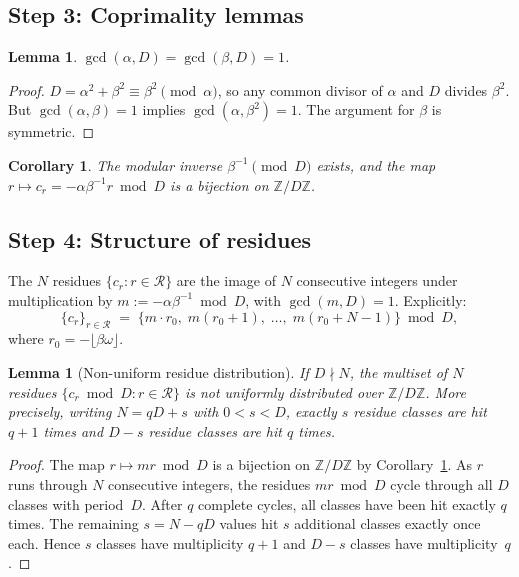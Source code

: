 \documentclass[11pt]{article}
\theoremstyle{plain}
\newtheorem{lemma}[theorem]{Lemma}
\newtheorem{corollary}[theorem]{Corollary}
\theoremstyle{definition}
\theoremstyle{remark}
\begin{document}
\subsection{Step 3: Coprimality lemmas}\label{subsec:step3}

\begin{lemma}\label{lem:gcd}
\(\gcd(\alpha, D) = \gcd(\beta, D) = 1\).
\end{lemma}

\begin{proof}
\(D = \alpha^2 + \beta^2 \equiv \beta^2 \pmod{\alpha}\), so any common
divisor of \(\alpha\) and \(D\) divides \(\beta^2\).  But
\(\gcd(\alpha,\beta)=1\) implies \(\gcd(\alpha,\beta^2)=1\).
The argument for \(\beta\) is symmetric.
\end{proof}

\begin{corollary}\label{cor:inverse}
The modular inverse \(\beta^{-1} \pmod{D}\) exists, and the map
\(r \mapsto c_r = -\alpha\beta^{-1}r \bmod D\) is a bijection on
\(\mathbb{Z}/D\mathbb{Z}\).
\end{corollary}

\subsection{Step 4: Structure of residues}\label{subsec:step4}

The \(N\) residues \(\{c_r : r \in \mathcal{R}\}\) are the image of \(N\)
consecutive integers under multiplication by
\(m := -\alpha\beta^{-1} \bmod D\), with \(\gcd(m, D) = 1\).  Explicitly:
\begin{equation}\label{eq:residues}
    \{c_r\}_{r \in \mathcal{R}} \;=\;
    \{m \cdot r_0,\; m(r_0+1),\; \ldots,\; m(r_0+N-1)\} \bmod D,
\end{equation}
where \(r_0 = -\lfloor\beta\omega\rfloor\).

\begin{lemma}[Non-uniform residue distribution]\label{lem:nonuniform}
If \(D \nmid N\), the multiset of \(N\) residues
\(\{c_r \bmod D : r \in \mathcal{R}\}\) is not uniformly distributed over
\(\mathbb{Z}/D\mathbb{Z}\).  More precisely, writing \(N = qD + s\) with
\(0 < s < D\), exactly \(s\) residue classes are hit \(q+1\) times and
\(D - s\) residue classes are hit \(q\) times.
\end{lemma}

\begin{proof}
The map \(r \mapsto mr \bmod D\) is a bijection on
\(\mathbb{Z}/D\mathbb{Z}\) by Corollary~\ref{cor:inverse}.
As \(r\) runs through \(N\) consecutive integers, the residues \(mr \bmod D\)
cycle through all \(D\) classes with period~\(D\).
After \(q\) complete cycles, all classes have been hit exactly \(q\) times.
The remaining \(s = N - qD\) values hit \(s\) additional classes exactly once
each.
Hence \(s\) classes have multiplicity \(q + 1\) and \(D - s\) classes have
multiplicity~\(q\).
\end{proof}
\end{document}
